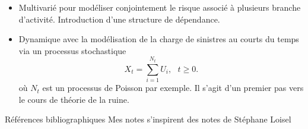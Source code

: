 \documentclass[8pt,notheorems]{beamer}
\theoremstyle{definition}
\theoremstyle{example}
\theoremstyle{mystyle}
\theoremstyle{plain}
\begin{document}
\begin{frame}[allowframebreaks]
\begin{itemize}
\begin{itemize}
        \item Multivarié pour modéliser conjointement le risque associé à plusieurs branche d'activité. Introduction d'une structure de dépendance.
        \item Dynamique avec la modélisation de la charge de sinistres au courts du temps via un processus stochastique 
        $$
        X_t = \sum_{i  = 1}^{N_t} U_i,\text{ }t\geq0.
        $$
        où $N_t$ est un processus de Poisson par exemple. Il s'agit d'un premier pas vers le cours de théorie de la ruine. 
    \end{itemize}
\end{itemize} 

\end{frame}
\begin{frame}[allowframebreaks]{Références bibliographiques}
Mes notes s'inspirent des notes de Stéphane Loisel \cite{Lo19}


\end{frame}
\end{document}

